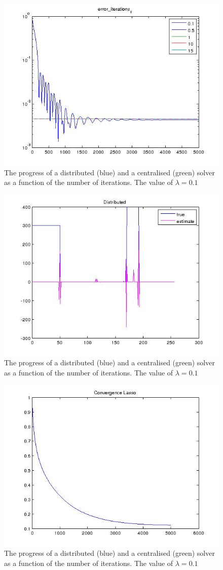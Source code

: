 \documentclass{article}
\begin{document}
\begin{figure}[h]
\centering
\includegraphics[height = 7.3 cm]{mse_iterations.jpg}
\caption{The progress of a distributed (blue) and a centralised (green) solver as a function of the number of iterations. The value of \(\lambda = 0.1\)}
\label{fig:erroriterations}
\end{figure}

\begin{figure}[h]
\centering
\includegraphics[height = 7.3 cm]{recon_spline.jpg}
\caption{The progress of a distributed (blue) and a centralised (green) solver as a function of the number of iterations. The value of \(\lambda = 0.1\)}
\label{fig:spline_recon}
\end{figure}

\begin{figure}[h]
\centering
\includegraphics[height = 7.3 cm]{steps.jpg}
\caption{The progress of a distributed (blue) and a centralised (green) solver as a function of the number of iterations. The value of \(\lambda = 0.1\)}
\label{fig:steps_wavelets}
\end{figure}
\end{document}
